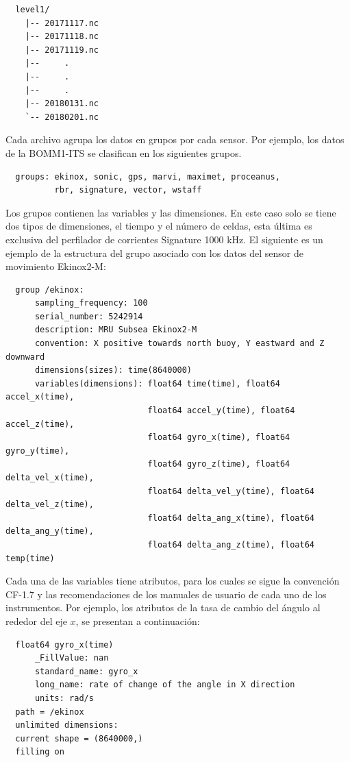 \documentclass[11pt]{article}
\begin{document}
\begin{verbatim}
  level1/
    |-- 20171117.nc
    |-- 20171118.nc
    |-- 20171119.nc
    |--     .
    |--     .
    |--     .
    |-- 20180131.nc
    `-- 20180201.nc
\end{verbatim}


Cada archivo agrupa los datos en grupos por cada sensor. Por ejemplo, los datos
de la BOMM1-ITS se clasifican en los siguientes grupos.

\begin{verbatim}
  groups: ekinox, sonic, gps, marvi, maximet, proceanus,
          rbr, signature, vector, wstaff
\end{verbatim}

Los grupos contienen las variables y las dimensiones. En este caso solo se tiene
dos tipos de dimensiones, el tiempo y el número de celdas, esta última es
exclusiva del perfilador de corrientes Signature 1000 kHz. El siguiente es un
ejemplo de la estructura del grupo asociado con los datos del sensor de
movimiento Ekinox2-M:

\begin{verbatim}
  group /ekinox:
      sampling_frequency: 100
      serial_number: 5242914
      description: MRU Subsea Ekinox2-M
      convention: X positive towards north buoy, Y eastward and Z downward
      dimensions(sizes): time(8640000)
      variables(dimensions): float64 time(time), float64 accel_x(time),
                             float64 accel_y(time), float64 accel_z(time),
                             float64 gyro_x(time), float64 gyro_y(time),
                             float64 gyro_z(time), float64 delta_vel_x(time),
                             float64 delta_vel_y(time), float64 delta_vel_z(time),
                             float64 delta_ang_x(time), float64 delta_ang_y(time),
                             float64 delta_ang_z(time), float64 temp(time)
\end{verbatim}

Cada una de las variables tiene atributos, para los cuales se sigue la
convención CF-1.7 y las recomendaciones de los manuales de usuario de cada uno
de los instrumentos. Por ejemplo, los atributos de la tasa de cambio del ángulo
al rededor del eje $x$, se presentan a continuación:

\begin{verbatim}
  float64 gyro_x(time)
      _FillValue: nan
      standard_name: gyro_x
      long_name: rate of change of the angle in X direction
      units: rad/s
  path = /ekinox
  unlimited dimensions:
  current shape = (8640000,)
  filling on
\end{verbatim}
\end{document}
